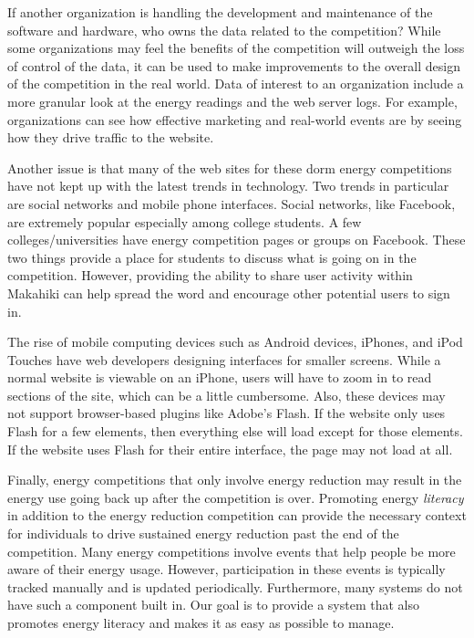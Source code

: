 If another organization is handling the development and maintenance of the software and hardware, who owns the data related to the competition? While some organizations may feel the benefits of the competition will outweigh the loss of control of the data, it can be used to make improvements to the overall design of the competition in the real world. Data of interest to an organization include a more granular look at the energy readings and the web server logs. For example, organizations can see how effective marketing and real-world events are by seeing how they drive traffic to the website.

Another issue is that many of the web sites for these dorm energy competitions have not kept up with the latest trends in technology.  Two trends in particular are social networks and mobile phone interfaces.  Social networks, like Facebook, are extremely popular especially among college students.  A few colleges/universities have energy competition pages or groups on Facebook.  These two things provide a place for students to discuss what is going on in the competition.  However, providing the ability to share user activity within Makahiki can help spread the word and encourage other potential users to sign in.

The rise of mobile computing devices such as Android devices, iPhones, and iPod Touches have web developers designing interfaces for smaller screens.  While a normal website is viewable on an iPhone, users will have to zoom in to read sections of the site, which can be a little cumbersome.  Also, these devices may not support browser-based plugins like Adobe's Flash.  If the website only uses Flash for a few elements, then everything else will load except for those elements.  If the website uses Flash for their entire interface, the page may not load at all.

Finally, energy competitions that only involve energy reduction may result in the energy use going back up after the competition is over. Promoting energy \emph{literacy} in addition to the energy reduction competition can provide the necessary context for individuals to drive sustained energy reduction past the end of the competition. Many energy competitions involve events that help people be more aware of their energy usage. However, participation in these events is typically tracked manually and is updated periodically. Furthermore, many systems do not have such a component built in. Our goal is to provide a system that also promotes energy literacy and makes it as easy as possible to manage.

